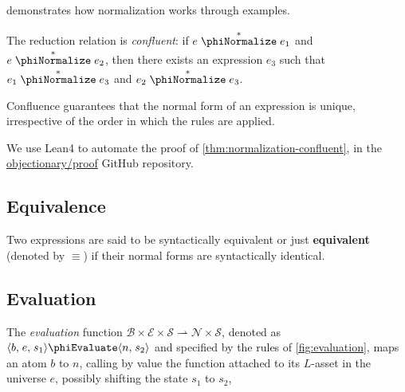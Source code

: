  demonstrates how normalization
  works through examples.

\begin{theorem}\label{thm:normalization-confluent}
The reduction relation is \emph{confluent}:
  if \(e \phiTransNormalize e_1\) and \(e \phiTransNormalize e_2\),
  then there exists an expression \(e_3\) such that
  \(e_1 \phiTransNormalize e_3\) and \(e_2 \phiTransNormalize e_3\).
\end{theorem}

Confluence guarantees that the normal form of an expression is unique,
  irrespective of the order in which the rules are applied.

We use Lean4 to automate the proof of \cref{thm:normalization-confluent},
  in the
  \href{https://github.com/objectionary/proof}{objectionary/proof}
  GitHub repository.

\subsection{Equivalence}\label{sec:equivalence}

\begin{definition}[Equivalence]
Two expressions are said to be syntactically equivalent or just
  \textbf{equivalent} (denoted by \(\equiv\)) if their normal forms are
  syntactically identical.
\end{definition}

\subsection{Evaluation}\label{sec:evaluation}
\makeatletter
\protected@edef{}%
\makeatother
\label{r:evaluate}

\begin{definition}[Evaluation]
The \emph{evaluation} function
  \(\mathcal{B} \times \mathcal{E} \times \mathcal{S}
    \rightharpoonup \mathcal{N} \times \mathcal{S} \),
  denoted as \(\phinoEvaluate{b}{e}{s_1}{n}{s_2}\)
  and specified by the rules of \cref{fig:evaluation},
  maps an atom \(b\) to \(n\),
  calling by value the function attached to its $L$-asset
  in the universe \(e\),
  possibly shifting the state \(s_1\) to \(s_2\),
\end{definition}


